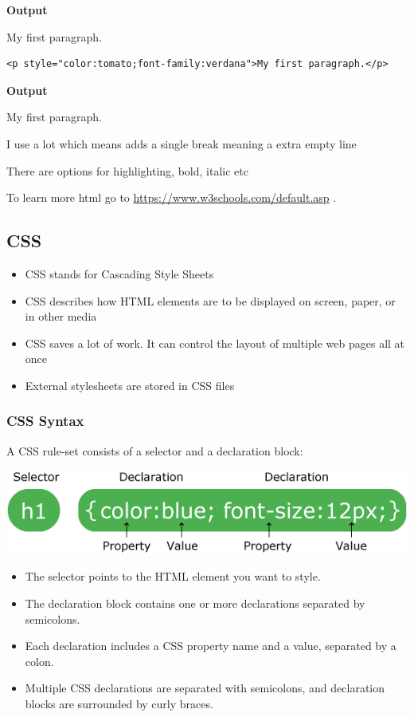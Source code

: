 \documentclass[
]{book}
\providecommand{\tightlist}{%
  \setlength{\itemsep}{0pt}\setlength{\parskip}{0pt}}
\begin{document}
\textbf{Output}

My first paragraph.

\begin{verbatim}
<p style="color:tomato;font-family:verdana">My first paragraph.</p>
\end{verbatim}

\textbf{Output}

My first paragraph.

I use a lot which means adds a single break meaning a extra empty line

There are options for highlighting, bold, italic etc

To learn more html go to \url{https://www.w3schools.com/default.asp} .

\hypertarget{css}{%
\subsection{CSS}\label{css}}

\begin{itemize}
\tightlist
\item
  CSS stands for Cascading Style Sheets
\item
  CSS describes how HTML elements are to be displayed on screen, paper, or in other media
\item
  CSS saves a lot of work. It can control the layout of multiple web pages all at once
\item
  External stylesheets are stored in CSS files
\end{itemize}

\hypertarget{css-syntax}{%
\subsubsection{CSS Syntax}\label{css-syntax}}

A CSS rule-set consists of a selector and a declaration block:

\includegraphics{img/css_selector.png}

\begin{itemize}
\item
  The selector points to the HTML element you want to style.
\item
  The declaration block contains one or more declarations separated by semicolons.
\item
  Each declaration includes a CSS property name and a value, separated by a colon.
\item
  Multiple CSS declarations are separated with semicolons, and declaration blocks are surrounded by curly braces.
\end{itemize}
\end{document}
